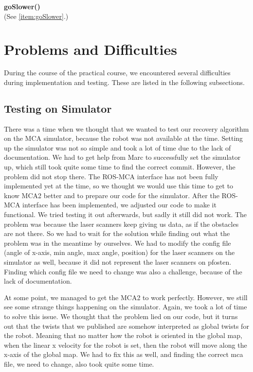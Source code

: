 \begin{description}
\item \textbf{goSlower()} \hfill \\
(See \ref{item:goSlower}.) 
\end{description}



\section{Problems and Difficulties} \label{problems}
During the course of the practical course, we encountered several difficulties during implementation and testing. These are listed in the following subsections.

\subsection{Testing on Simulator}

There was a time when we thought that we wanted to test our recovery algorithm on the MCA simulator, because the robot was not available at the time. Setting up the simulator was not so simple and took a lot of time due to the lack of documentation. We had to get help from Marc to successfully set the simulator up, which still took quite some time to find the correct commit. However, the problem did not stop there. The ROS-MCA interface has not been fully implemented yet at the time, so we thought we would use this time to get to know MCA2 better and to prepare our code for the simulator. After the ROS-MCA interface has been implemented, we adjusted our code to make it functional. We tried testing it out afterwards, but sadly it still did not work. The problem was because the laser scanners keep giving us data, as if the obstacles are not there. So we had to wait for the solution while finding out what the problem was in the meantime by ourselves. We had to modify the config file (angle of x-axis, min angle, max angle, position) for the laser scanners on the simulator as well, because it did not represent the laser scanners on pfosten. Finding which config file we need to change was also a challenge, because of the lack of documentation. 

At some point, we managed to get the MCA2 to work perfectly. However, we still see some strange things happening on the simulator. Again, we took a lot of time to solve this issue. We thought that the problem lied on our code, but it turns out that the twists that we published are somehow interpreted as global twists for the robot. Meaning that no matter how the robot is oriented in the global map, when the linear x velocity for the robot is set, then the robot will move along the x-axis of the global map. We had to fix this as well, and finding the correct mca file, we need to change, also took quite some time.

